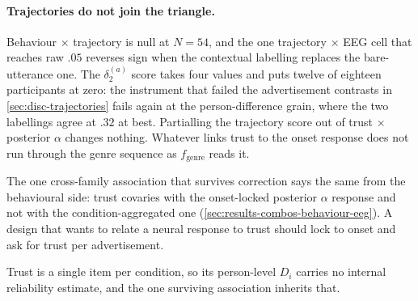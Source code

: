 \paragraph{Trajectories do not join the triangle.}
Behaviour \(\times\) trajectory is null at \(N=54\), and the one trajectory \(\times\) EEG cell that reaches raw \(.05\) reverses sign when the contextual labelling replaces the bare-utterance one. The \(\delta^{(a)}_2\) score takes four values and puts twelve of eighteen participants at zero: the instrument that failed the advertisement contrasts in \autoref{sec:disc-trajectories} fails again at the person-difference grain, where the two labellings agree at \(.32\) at best. Partialling the trajectory score out of trust \(\times\) posterior \(\alpha\) changes nothing. Whatever links trust to the onset response does not run through the genre sequence as \(f_{\mathrm{genre}}\) reads it.


The one cross-family association that survives correction says the same from the behavioural side: trust covaries with the onset-locked posterior \(\alpha\) response and not with the condition-aggregated one (\autoref{sec:results-combos-behaviour-eeg}). A design that wants to relate a neural response to trust should lock to onset and ask for trust per advertisement.


Trust is a single item per condition, so its person-level \(D_i\) carries no internal reliability estimate, and the one surviving association inherits that.
